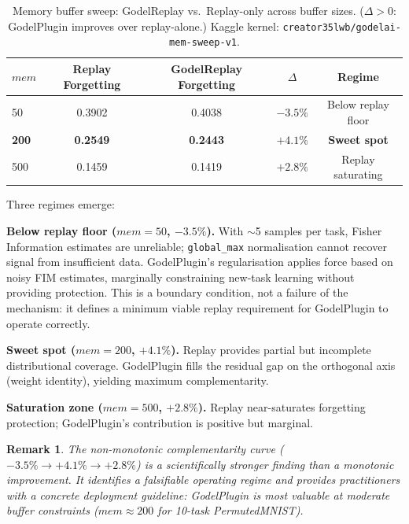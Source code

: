 \documentclass[12pt]{article}
\newtheorem{remark}{Remark}
\begin{document}
\begin{table}[ht]
\centering
\caption{Memory buffer sweep: GodelReplay vs.\ Replay-only across buffer sizes.
  ($\Delta > 0$: GodelPlugin improves over replay-alone.)
  Kaggle kernel: \texttt{creator35lwb/godelai-mem-sweep-v1}.}
\label{tab:sweep}
\begin{tabular}{lcccc}
\toprule
$\mathit{mem}$ & \textbf{Replay Forgetting} & \textbf{GodelReplay Forgetting} & $\Delta$ & \textbf{Regime} \\
\midrule
50  & 0.3902 & 0.4038 & $-3.5\%$ & Below replay floor \\
\textbf{200} & \textbf{0.2549} & \textbf{0.2443} & $\mathbf{+4.1\%}$ & \textbf{Sweet spot} \\
500 & 0.1459 & 0.1419 & $+2.8\%$ & Replay saturating \\
\bottomrule
\end{tabular}
\end{table}

Three regimes emerge:

\textbf{Below replay floor ($\mathit{mem}{=}50$, $-3.5\%$).}
With $\sim$5 samples per task, Fisher Information estimates are unreliable;
\texttt{global\_max} normalisation cannot recover signal from insufficient data.
GodelPlugin's regularisation applies force based on noisy FIM estimates,
marginally constraining new-task learning without providing protection.
This is a boundary condition, not a failure of the mechanism: it defines
a minimum viable replay requirement for GodelPlugin to operate correctly.

\textbf{Sweet spot ($\mathit{mem}{=}200$, $+4.1\%$).}
Replay provides partial but incomplete distributional coverage.
GodelPlugin fills the residual gap on the orthogonal axis (weight identity),
yielding maximum complementarity.

\textbf{Saturation zone ($\mathit{mem}{=}500$, $+2.8\%$).}
Replay near-saturates forgetting protection; GodelPlugin's contribution is
positive but marginal.

\begin{remark}
  The non-monotonic complementarity curve ($-3.5\% \to +4.1\% \to +2.8\%$)
  is a scientifically stronger finding than a monotonic improvement.
  It identifies a falsifiable operating regime and provides practitioners
  with a concrete deployment guideline: GodelPlugin is most valuable at
  moderate buffer constraints ($\mathit{mem}{\approx}200$ for 10-task
  PermutedMNIST).
\end{remark}
\end{document}
